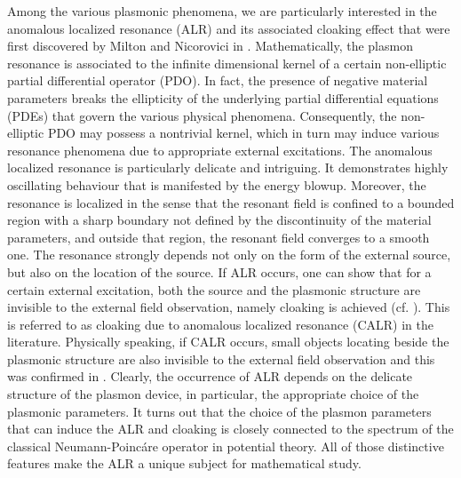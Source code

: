 \documentclass[11pt,reqno,twoside]{amsart}
\theoremstyle{definition}
\theoremstyle{remark}
\numberwithin{equation}{section}
\begin{document}
Among the various plasmonic phenomena, we are particularly interested in the anomalous localized resonance (ALR) and its associated cloaking effect that were first discovered by Milton and Nicorovici in \cite{GWM3}. Mathematically, the plasmon resonance is associated to the infinite dimensional kernel of a certain non-elliptic partial differential operator (PDO). In fact, the presence of negative material parameters breaks the ellipticity of the underlying partial differential equations (PDEs) that govern the various physical phenomena. Consequently, the non-elliptic PDO may possess a nontrivial kernel, which in turn may induce various resonance phenomena due to appropriate external excitations. The anomalous localized resonance is particularly delicate and intriguing. It demonstrates highly oscillating behaviour that is manifested by the energy blowup. Moreover, the resonance is localized in the sense that the resonant field is confined to a bounded region with a sharp boundary not defined by the discontinuity of the material parameters, and outside that region, the resonant field converges to a smooth one. The resonance strongly depends not only on the form of the external source, but also on the location of the source. If ALR occurs, one can show that for a certain external excitation, both the source and the plasmonic structure are invisible to the external field observation, namely cloaking is achieved (cf. \cite{Ack13,GWM3}). This is referred to as cloaking due to anomalous localized resonance (CALR) in the literature. Physically speaking, if CALR occurs, small objects locating beside the plasmonic structure are also invisible to the external field observation and this was confirmed in \cite{Ngu1}. Clearly, the occurrence of ALR depends on the delicate structure of the plasmon device, in particular, the appropriate choice of the plasmonic parameters. It turns out that the choice of the plasmon parameters that can induce the ALR and cloaking is closely connected to the spectrum of the classical Neumann-Poinc\'are operator in potential theory. All of those distinctive features make the ALR a unique subject for mathematical study.
\end{document}
